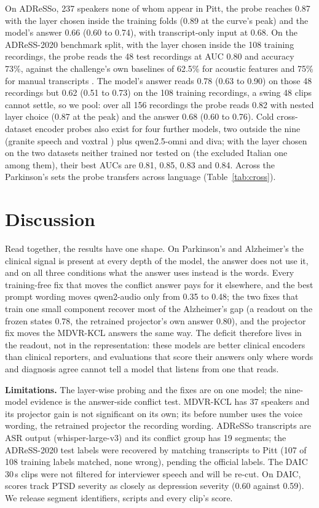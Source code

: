 \documentclass{article}
\begin{document}
On ADReSSo, 237 speakers none of whom appear in Pitt, the probe reaches 0.87 with the layer chosen
inside the training folds (0.89 at the curve's peak) and the model's answer 0.66 (0.60 to 0.74), with
transcript-only input at 0.68. On the ADReSS-2020 benchmark split, with the layer chosen inside the
108 training recordings, the probe reads the 48 test recordings at AUC 0.80 and accuracy 73\%,
against the challenge's own baselines of 62.5\% for acoustic features and 75\% for manual transcripts
\cite{adress2020}. The model's answer reads 0.78 (0.63 to 0.90) on those 48 recordings but 0.62 (0.51
to 0.73) on the 108 training recordings, a swing 48 clips cannot settle, so we pool: over all 156
recordings the probe reads 0.82 with nested layer choice (0.87 at the peak) and the answer 0.68 (0.60
to 0.76). Cold cross-dataset encoder probes also exist for four further models, two outside the nine (granite
speech \cite{granite} and voxtral \cite{voxtral}) plus qwen2.5-omni and diva; with the layer chosen
on the two datasets neither trained nor tested on (the excluded Italian one among them), their best
AUCs are 0.81, 0.85, 0.83 and 0.84. Across the Parkinson's sets the probe transfers
across language (Table~\ref{tab:cross}).

\section{Discussion}\label{sec:discussion}

Read together, the results have one shape. On Parkinson's and Alzheimer's the clinical signal is
present at every depth of the model, the answer does not use it, and on all three conditions what the
answer uses instead is the words. Every training-free fix that moves the conflict answer pays for it
elsewhere, and the best prompt wording moves qwen2-audio only from 0.35 to 0.48; the two fixes that
train one small component recover most of the Alzheimer's gap (a readout on the frozen states 0.78,
the retrained projector's own answer 0.80), and the projector fix moves the MDVR-KCL answers the same
way. The deficit therefore lives
in the readout, not in the representation:
these models are better clinical encoders than clinical reporters, and evaluations that score
their answers only where words and diagnosis agree cannot tell a model that listens from one that
reads.

\noindent\textbf{Limitations.} The layer-wise probing and the fixes are on one model; the nine-model
evidence is the answer-side conflict test. MDVR-KCL has 37 speakers and its projector gain is
not significant on its own; its before number uses the voice wording, the retrained projector the
recording wording. ADReSSo transcripts are ASR output (whisper-large-v3) and its conflict
group has 19 segments; the ADReSS-2020 test labels were recovered by matching transcripts to Pitt
(107 of 108 training labels matched, none wrong), pending the official labels. The DAIC 30\,s clips were not filtered for
interviewer speech and will be re-cut. On DAIC, scores track PTSD severity
as closely as depression severity (0.60 against 0.59). We release segment identifiers, scripts and every clip's score.
\end{document}
